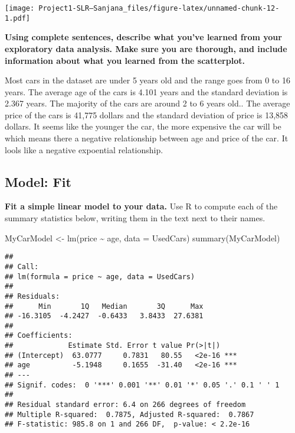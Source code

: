 \documentclass[
]{article}
\newenvironment{Shaded}{\begin{snugshade}}{\end{snugshade}}
\newcommand{\AttributeTok}[1]{\textcolor[rgb]{0.77,0.63,0.00}{#1}}
\newcommand{\FunctionTok}[1]{\textcolor[rgb]{0.00,0.00,0.00}{#1}}
\newcommand{\NormalTok}[1]{#1}
\newcommand{\OtherTok}[1]{\textcolor[rgb]{0.56,0.35,0.01}{#1}}
\newcommand{\SpecialCharTok}[1]{\textcolor[rgb]{0.00,0.00,0.00}{#1}}
\begin{document}
\texttt{[image: Project1-SLR--Sanjana\_files/figure-latex/unnamed-chunk-12-1.pdf]}

\textbf{Using complete sentences, describe what you've learned from your
exploratory data analysis. Make sure you are thorough, and include
information about what you learned from the scatterplot.}

Most cars in the dataset are under 5 years old and the range goes from 0
to 16 years. The average age of the cars is 4.101 years and the standard
deviation is 2.367 years. The majority of the cars are around 2 to 6
years old.. The average price of the cars is 41,775 dollars and the
standard deviation of price is 13,858 dollars. It seems like the younger
the car, the more expensive the car will be which means there a negative
relationship between age and price of the car. It lools like a negative
expoential relationship.

\hypertarget{model-fit}{%
\subsection{Model: Fit}\label{model-fit}}

\textbf{Fit a simple linear model to your data.} Use R to compute each
of the summary statistics below, writing them in the text next to their
names.

\begin{Shaded}
\begin{Highlighting}[]
\NormalTok{MyCarModel }\OtherTok{\textless{}{-}} \FunctionTok{lm}\NormalTok{(price }\SpecialCharTok{\textasciitilde{}}\NormalTok{ age, }\AttributeTok{data =}\NormalTok{ UsedCars)}
\FunctionTok{summary}\NormalTok{(MyCarModel)}
\end{Highlighting}
\end{Shaded}

\begin{verbatim}
## 
## Call:
## lm(formula = price ~ age, data = UsedCars)
## 
## Residuals:
##      Min       1Q   Median       3Q      Max 
## -16.3105  -4.2427  -0.6433   3.8433  27.6381 
## 
## Coefficients:
##             Estimate Std. Error t value Pr(>|t|)    
## (Intercept)  63.0777     0.7831   80.55   <2e-16 ***
## age          -5.1948     0.1655  -31.40   <2e-16 ***
## ---
## Signif. codes:  0 '***' 0.001 '**' 0.01 '*' 0.05 '.' 0.1 ' ' 1
## 
## Residual standard error: 6.4 on 266 degrees of freedom
## Multiple R-squared:  0.7875, Adjusted R-squared:  0.7867 
## F-statistic: 985.8 on 1 and 266 DF,  p-value: < 2.2e-16
\end{verbatim}
\end{document}
